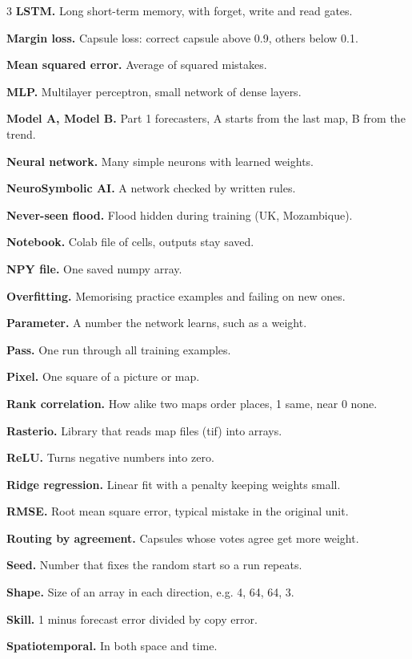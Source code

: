 \begin{multicols}{3}
\textbf{LSTM.} Long short-term memory, with forget, write and read gates.\par
\textbf{Margin loss.} Capsule loss: correct capsule above 0.9, others below 0.1.\par
\textbf{Mean squared error.} Average of squared mistakes.\par
\textbf{MLP.} Multilayer perceptron, small network of dense layers.\par
\textbf{Model A, Model B.} Part 1 forecasters, A starts from the last map, B from the trend.\par
\textbf{Neural network.} Many simple neurons with learned weights.\par
\textbf{NeuroSymbolic AI.} A network checked by written rules.\par
\textbf{Never-seen flood.} Flood hidden during training (UK, Mozambique).\par
\textbf{Notebook.} Colab file of cells, outputs stay saved.\par
\textbf{NPY file.} One saved numpy array.\par
\textbf{Overfitting.} Memorising practice examples and failing on new ones.\par
\textbf{Parameter.} A number the network learns, such as a weight.\par
\textbf{Pass.} One run through all training examples.\par
\textbf{Pixel.} One square of a picture or map.\par
\textbf{Rank correlation.} How alike two maps order places, 1 same, near 0 none.\par
\textbf{Rasterio.} Library that reads map files (tif) into arrays.\par
\textbf{ReLU.} Turns negative numbers into zero.\par
\textbf{Ridge regression.} Linear fit with a penalty keeping weights small.\par
\textbf{RMSE.} Root mean square error, typical mistake in the original unit.\par
\textbf{Routing by agreement.} Capsules whose votes agree get more weight.\par
\textbf{Seed.} Number that fixes the random start so a run repeats.\par
\textbf{Shape.} Size of an array in each direction, e.g. 4, 64, 64, 3.\par
\textbf{Skill.} 1 minus forecast error divided by copy error.\par
\textbf{Spatiotemporal.} In both space and time.\par

\end{multicols}
